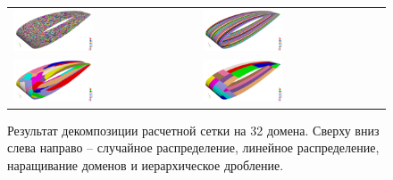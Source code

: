 \begin{figure}[ht]
\centering
\begin{tabular}{ll}
\includegraphics[width=0.45\textwidth]{./pics/text_2_decompsurf/wing_random_32.png}
&
\includegraphics[width=0.45\textwidth]{./pics/text_2_decompsurf/wing_linear_32.png}
\\
\includegraphics[width=0.45\textwidth]{./pics/text_2_decompsurf/wing_rgrow_32.png}
&
\includegraphics[width=0.45\textwidth]{./pics/text_2_decompsurf/wing_hierarchical_32.png}
\end{tabular}
\singlespacing
{}\caption{Результат декомпозиции расчетной сетки на 32 домена. Сверху вниз слева направо -- случайное распределение, линейное распределение, наращивание доменов и иерархическое дробление\label{term:alg_decomp_hierarch}.}
\label{fig:text_2_decompsurf_4}
\end{figure}

